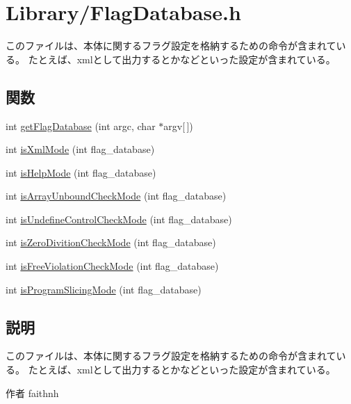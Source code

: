 \section{Library/FlagDatabase.h}
\label{FlagDatabase_8h}


このファイルは、本体に関するフラグ設定を格納するための命令が含まれている。 たとえば、xmlとして出力するとかなどといった設定が含まれている。  


\subsection*{関数}
\begin{DoxyCompactItemize}
\item 
int \hyperlink{FlagDatabase_8h_a6251c68e59b9279fe6e9a633c7623a7b}{getFlagDatabase} (int argc, char $\ast$argv\mbox{[}$\,$\mbox{]})
\item 
int \hyperlink{FlagDatabase_8h_a857ab1a8518b12d818a4a721d86cd7d2}{isXmlMode} (int flag\_\-database)
\item 
int \hyperlink{FlagDatabase_8h_acb5e649e1fa4a1dd3f601c061546cfa1}{isHelpMode} (int flag\_\-database)
\item 
int \hyperlink{FlagDatabase_8h_a31ec7c6c4dadc21a358dbfb1588dc658}{isArrayUnboundCheckMode} (int flag\_\-database)
\item 
int \hyperlink{FlagDatabase_8h_a6e4f1f83cd39bb7596fe8113ac359e53}{isUndefineControlCheckMode} (int flag\_\-database)
\item 
int \hyperlink{FlagDatabase_8h_a3bf7c9c1781a4272d23e3febafba7c75}{isZeroDivitionCheckMode} (int flag\_\-database)
\item 
int \hyperlink{FlagDatabase_8h_ab2ada4a96f6c814a5a7355ecc246fc92}{isFreeViolationCheckMode} (int flag\_\-database)
\item 
int \hyperlink{FlagDatabase_8h_ad92d7f4f3f5917cf37de9cf9e0bd501f}{isProgramSlicingMode} (int flag\_\-database)
\end{DoxyCompactItemize}


\subsection{説明}
このファイルは、本体に関するフラグ設定を格納するための命令が含まれている。 たとえば、xmlとして出力するとかなどといった設定が含まれている。 \begin{DoxyAuthor}{作者}
faithnh 
\end{DoxyAuthor}


